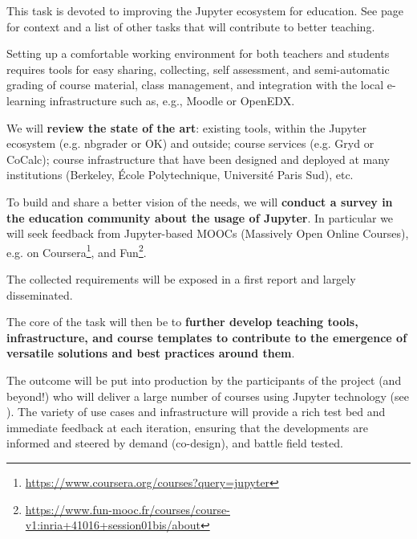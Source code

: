 \begin{task}[
  title={Teaching tools, infrastructure, and best practices},
  id=teaching-tools,
  lead=EP,
  PM=21, %
  wphases={0-36!.7},
  partners={UPSUD}
  ]

  This task is devoted to improving the Jupyter ecosystem for
  education. See page \pageref{sec:concept-demonstrator-teaching} for
  context and a list of other tasks that will contribute to better
  teaching.

  Setting up a comfortable working environment for both teachers and
  students requires tools for easy sharing, collecting, self
  assessment, and semi-automatic grading of course material, class
  management, and integration with the local e-learning infrastructure
  such as, e.g., Moodle or OpenEDX.

  We will \textbf{review the state of the art}: existing tools,
  within the Jupyter ecosystem (e.g. nbgrader \cite{Hamrick2016} or OK\cite{OKpy}) and outside;
  course services (e.g. Gryd\cite{Gryd} or CoCalc\cite{Cocalc}); course infrastructure that
  have been designed and deployed at many institutions (Berkeley,
  École Polytechnique, Université Paris Sud), etc.

  To build and share a better vision of the needs, we will \textbf{conduct a
  survey in the education community about the usage of Jupyter}. In
  particular we will seek feedback from Jupyter-based MOOCs (Massively Open Online Courses),
  e.g. on
  Coursera\footnote{\url{https://www.coursera.org/courses?query=jupyter}},
  and
  Fun\footnote{\url{https://www.fun-mooc.fr/courses/course-v1:inria+41016+session01bis/about}}.

  The collected requirements will be exposed in a first report
   and largely disseminated.

  The core of the task will then be to \textbf{further develop
    teaching tools, infrastructure, and course templates to contribute
    to the emergence of versatile solutions and best practices around
    them}.

  The outcome will be put into production by the participants of the
  \TheProject project (and beyond!) who will deliver a large number of
  courses using Jupyter technology (see ). The variety of
  use cases and infrastructure will provide a rich test bed and
  immediate feedback at each iteration, ensuring that the developments
  are informed and steered by demand (co-design), and battle field
  tested.


\end{task}
